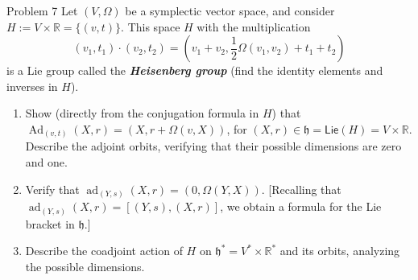 \begin{thing1}{Problem 7}\leavevmode
	Let $(V,\Omega)$ be a symplectic vector space, and consider $H:=V\times \mathbb{R}=\{(v,t)\}$. This space $H$ with the multiplication
	\[(v_1,t_1)\cdot(v_2,t_2)=\left( v_1+v_2,\frac{1}{2}\Omega(v_1,v_2)+t_1+t_2 \right) \]
	is a Lie group called the \textit{\textbf{Heisenberg group}} (find the identity elements and inverses in  $H$).
	\begin{enumerate}[label=\alph*.]
		\item Show (directly from the conjugation formula in $H$) that $\operatorname{Ad}_{(v,t)}(X,r)=(X,r+\Omega(v,X))$, for $(X,r)\in\mathfrak{h}=\mathsf{Lie}(H) =V\times \mathbb{R}$. Describe the adjoint orbits, verifying that their possible dimensions are zero and one.
		\item Verify that $\operatorname{ad}_{(Y,s)}(X,r)=(0,\Omega(Y,X))$. [Recalling that $\operatorname{ad}_{(Y,s)}(X,r)=[(Y,s),(X,r)]$, we obtain a formula for the Lie bracket in $ \mathfrak{h}$.]
		\item Describe the coadjoint action of $H$ on $\mathfrak{h}^*=V^*\times \mathbb{R}^*$ and its orbits, analyzing the possible dimensions.
	\end{enumerate}
\end{thing1}

